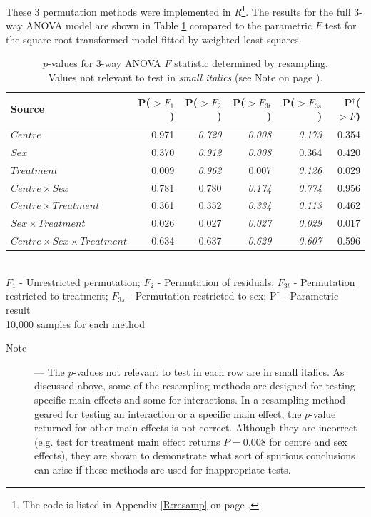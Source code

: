 These 3 permutation methods were implemented in \emph{R}\footnote{The code is listed in Appendix \ref{R:resamp} on page \pageref{R:resamp}.}. The results for the full 3-way ANOVA model are shown in Table \ref{aovresamp} compared to the parametric $F$ test for the square-root transformed model fitted by weighted least-squares.
\begin{table}[h]
\centering
\caption{$p$-values for 3-way ANOVA $F$ statistic determined by resampling.\\Values not relevant to test in \small{\textit{small italics}} (see Note on page \pageref{resampnote}).}\label{aovresamp}
\begin{tabular}{l|rrrr|r}                   
Source						&P($>F_{1}$)&P($>F_{2}$)&P($>F_{3t}$)&P($>F_{3s}$)&P$^{\dag}$($>F$)\\
\hline
$Centre$     					& 0.971 & \small{\textit{0.720}} & \small{\textit{0.008}} & \small{\textit{0.173}} & 0.354 \\    
$Sex$        					& 0.370 & \small{\textit{0.912}} & \small{\textit{0.008}} & 0.364 & 0.420 \\  
$Treatment$  					& 0.009 & \small{\textit{0.962}} & 0.007 			   & \small{\textit{0.126}} & 0.029 \\
$Centre\times Sex$ 				& 0.781 & 0.780 			& \small{\textit{0.174}} & \small{\textit{0.774}} & 0.956 \\
$Centre\times Treatment$ 		& 0.361 & 0.352 			& \small{\textit{0.334}} & \small{\textit{0.113}} & 0.462 \\
$Sex\times Treatment$     		& 0.026 & 0.027 			& \small{\textit{0.027}} & \small{\textit{0.029}} & 0.017 \\
$Centre\times Sex\times Treatment$& 0.634 & 0.637 			& \small{\textit{0.629}} & \small{\textit{0.607}} & 0.596
\end{tabular}\\
$F_{1}$ - Unrestricted permutation; $F_{2}$ - Permutation of residuals; $F_{3t}$ - Permutation restricted to treatment; $F_{3s}$ - Permutation restricted to sex; P$^{\dag}$ - Parametric result\\
10,000 samples for each method
\end{table}
\begin{description}
\item[Note]\label{resampnote} --- The $p$-values not relevant to test in each row are in small italics. As discussed above, some of the resampling methods are designed for testing specific main effects and some for interactions. In a resampling method geared for testing an interaction or a specific main effect, the $p$-value returned for other main effects is not correct. Although they are incorrect (e.g. test for treatment main effect returns $P=0.008$ for centre and sex effects), they are shown to demonstrate what sort of spurious conclusions can arise if these methods are used for inappropriate tests.
\end{description}


